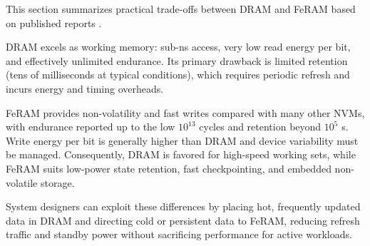 This section summarizes practical trade-offs between DRAM and FeRAM based on published reports \cite{choi2022,kim2021_dram,iedm2023_dram,noheda2023,martin2020}.

DRAM excels as working memory: sub-ns access, very low read energy per bit, and effectively unlimited endurance. Its primary drawback is limited retention (tens of milliseconds at typical conditions), which requires periodic refresh and incurs energy and timing overheads.

FeRAM provides non-volatility and fast writes compared with many other NVMs, with endurance reported up to the low $10^{13}$ cycles and retention beyond $10^5$ s. Write energy per bit is generally higher than DRAM and device variability must be managed. Consequently, DRAM is favored for high-speed working sets, while FeRAM suits low-power state retention, fast checkpointing, and embedded non-volatile storage.

System designers can exploit these differences by placing hot, frequently updated data in DRAM and directing cold or persistent data to FeRAM, reducing refresh traffic and standby power without sacrificing performance for active workloads.
